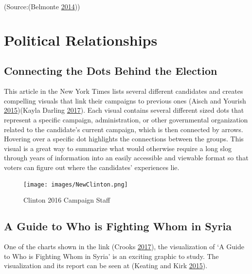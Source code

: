 \documentclass[]{book}
\begin{document}
(Source:(Belmonte \protect\hyperlink{ref-SotU2014}{2014}))

\section{Political Relationships}\label{political-relationships}

\subsection{Connecting the Dots Behind the
Election}\label{connecting-the-dots-behind-the-election}

This article in the New York Times lists several different candidates
and creates compelling visuals that link their campaigns to previous
ones (Aisch and Yourish
\protect\hyperlink{ref-campaign_staff}{2015})(Kayla Darling
\protect\hyperlink{ref-cool_data}{2017}). Each visual contains several
different sized dots that represent a specific campaign, administration,
or other governmental organization related to the candidate's current
campaign, which is then connected by arrows. Hovering over a specific
dot highlights the connections between the groups. This visual is a
great way to summarize what would otherwise require a long slog through
years of information into an easily accessible and viewable format so
that voters can figure out where the candidates' experiences lie.

\begin{figure}
\centering
\texttt{[image: images/NewClinton.png]}
\caption{Clinton 2016 Campaign Staff}
\end{figure}

\subsection{A Guide to Who is Fighting Whom in
Syria}\label{a-guide-to-who-is-fighting-whom-in-syria}

One of the charts shown in the link (Crooks
\protect\hyperlink{ref-int_viz_capt}{2017}), the visualization of `A
Guide to Who is Fighting Whom in Syria' is an exciting graphic to study.
The visualization and its report can be seen at (Keating and Kirk
\protect\hyperlink{ref-syria_chart}{2015}).
\end{document}
